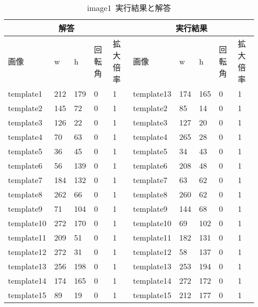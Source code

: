\begin{table}[]
\centering
\caption{image1~実行結果と解答}
\label{my-label1}
\begin{tabular}{|l|l|l|l|l||l|l|l|l|l|}
\hline
\multicolumn{5}{|c||}{解答}          & \multicolumn{5}{c|}{実行結果}             \\ \hline
画像         & w   & h   & 回転角 & 拡大倍率 & 画像         & w   & h   & 回転角 & 拡大倍率 \\ \hline
\rowcolor[HTML]{C0C0C0}
template1	&212	&179	&0	&1& template13	& 174	&	165&	0&	1 \\ \hline
\rowcolor[HTML]{C0C0C0}
template2	&145	&72	&0	&1& template2 	& 85 	&	14 &	0&	1 \\ \hline
template3	&126	&22	&0	&1& template3 	& 127	&	20 &	0&	1 \\ \hline
\rowcolor[HTML]{C0C0C0}
template4	&70	&63	&0	&1& template4 	& 265	&	28 &	0&	1 \\ \hline
template5	&36	&45	&0	&1& template5 	& 34 	&	43 &	0&	1 \\ \hline
\rowcolor[HTML]{C0C0C0}
template6	&56	&139	&0	&1& template6 	& 208	&	48 &	0&	1 \\ \hline
\rowcolor[HTML]{C0C0C0}
template7	&184	&132	&0	&1& template7 	& 63 	&	62 &	0&	1 \\ \hline
template8	&262	&66	&0	&1& template8 	& 260	&	62 &	0&	1 \\ \hline
\rowcolor[HTML]{C0C0C0}
template9	&71	&104	&0	&1& template9 	& 144	&	68 &	0&	1 \\ \hline
\rowcolor[HTML]{C0C0C0}
template10	&272	&170	&0	&1& template10	& 69 	&	102&	0&	1 \\ \hline
\rowcolor[HTML]{C0C0C0}
template11	&209	&51	&0	&1& template11	& 182	&	131&	0&	1 \\ \hline
\rowcolor[HTML]{C0C0C0}
template12	&272	&31	&0	&1& template12	& 58 	&	137&	0&	1 \\ \hline
template13	&256	&198	&0	&1& template13	& 253	&	194&	0&	1 \\ \hline
\rowcolor[HTML]{C0C0C0}
template14	&174	&165	&0	&1& template14	& 272	&	172&	0&	1 \\ \hline
\rowcolor[HTML]{C0C0C0}
template15	&89	&19	&0	&1& template15	& 212	&	177&	0&	1 \\ \hline
\end{tabular}
\end{table}
